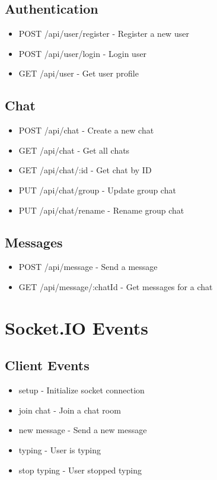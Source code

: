 \documentclass[12pt,a4paper]{article}
\begin{document}
\subsection{Authentication}
\begin{itemize}
    \item POST /api/user/register - Register a new user
    \item POST /api/user/login - Login user
    \item GET /api/user - Get user profile
\end{itemize}

\subsection{Chat}
\begin{itemize}
    \item POST /api/chat - Create a new chat
    \item GET /api/chat - Get all chats
    \item GET /api/chat/:id - Get chat by ID
    \item PUT /api/chat/group - Update group chat
    \item PUT /api/chat/rename - Rename group chat
\end{itemize}

\subsection{Messages}
\begin{itemize}
    \item POST /api/message - Send a message
    \item GET /api/message/:chatId - Get messages for a chat
\end{itemize}

\section{Socket.IO Events}
\subsection{Client Events}
\begin{itemize}
    \item setup - Initialize socket connection
    \item join chat - Join a chat room
    \item new message - Send a new message
    \item typing - User is typing
    \item stop typing - User stopped typing
\end{itemize}
\end{document}
